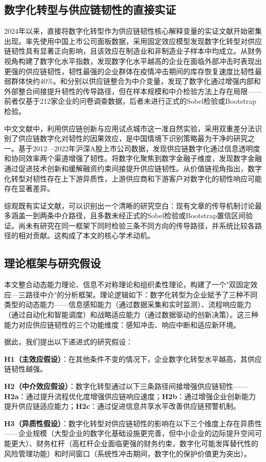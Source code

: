 \subsection{数字化转型与供应链韧性的直接实证}

2024年以来，直接将数字化转型作为供应链韧性核心解释变量的实证文献开始密集出现。\cite{li2025digital}率先使用中国上市公司面板数据，采用固定效应模型发现数字化转型对供应链韧性具有显著正向影响，且该效应在制造业和非制造业子样本中均成立。\cite{qi2024enterprise}从财务视角构建了数字化水平指数，发现数字化水平越高的企业在面临外部冲击时表现出更强的供应链韧性，韧性最强的企业群体在疫情冲击期间的库存恢复速度比韧性最弱群体快约40\%。\cite{zhang2025impact}和\cite{yuan2024effects}分别以供应链整合为中介变量，发现了数字化通过增强内部和外部整合间接提升韧性的传导路径，但在样本规模和中介检验方法上存在局限——前者仅基于212家企业的问卷调查数据，后者未进行正式的Sobel检验或Bootstrap检验。

中文文献中，\cite{zhang2024supply}利用供应链创新与应用试点城市这一准自然实验，采用双重差分法识别了供应链数字化对韧性的因果效应，是中国情境下识别策略最为干净的研究之一。\cite{liude2025supply}基于2012—2022年沪深A股上市公司数据，发现供应链数字化通过信息透明度和协同效率两个渠道增强了韧性。\cite{shi2024digital}将数字化聚焦到数字金融子维度，发现数字金融通过促进技术创新和缓解融资约束间接提升供应链韧性。\cite{song2025valuechain}从价值链视角指出，数字化转型对韧性存在上下游异质性，上游供应商和下游客户对数字化的韧性响应可能存在显著差异。

综观既有实证文献，可以识别出一个清晰的研究空白：现有文章的传导机制讨论最多涵盖一到两条中介路径，且多数未经正式的Sobel检验或Bootstrap置信区间验证。尚未有研究在同一框架下同时检验三条不同方向的传导路径，并系统比较各路径的相对贡献。这构成了本文的核心学术动机。

\subsection{理论框架与研究假设}

本文整合动态能力理论、信息不对称理论和组织柔性理论，构建了一个"双固定效应—三路径中介"的分析框架。理论逻辑如下：数字化转型为企业赋予了三种不同类型的动态能力——信息感知能力（通过数据采集和实时监测）、流程响应能力（通过自动化和智能调度）和战略适应能力（通过数据驱动的创新决策）。这三种能力对应供应链韧性的三个功能维度：感知冲击、响应中断和适应新环境。

据此，我们提出以下递进式的研究假设：

\textbf{H1（主效应假设）}：在其他条件不变的情况下，企业数字化转型水平越高，其供应链韧性越强。

\textbf{H2（中介效应假设）}：数字化转型通过以下三条路径间接增强供应链韧性——\textbf{H2a}：通过提升流程优化度增强供应链响应速度；\textbf{H2b}：通过增强企业创新能力提升供应链适应能力；\textbf{H2c}：通过促进信息共享水平改善供应链预警机制。

\textbf{H3（异质性假设）}：数字化转型对供应链韧性的影响在以下三个维度上存在异质性——企业规模（大型企业的数字化基础设施更完善，但中小企业的边际提升空间可能更大）、财务杠杆（高杠杆企业面临更强的财务约束，数字化可能发挥替代性的风险管理功能）和时间窗口（系统性冲击期间，数字化的保护价值更为突出）。